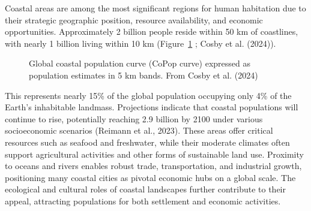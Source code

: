\documentclass[
  letterpaper,
  11pt,
  english,
  singlespacing,
  headsepline]{MastersDoctoralThesis}
\begin{document}
\begin{spacing}{1.5}
Coastal areas are among the most significant regions for human
habitation due to their strategic geographic position, resource
availability, and economic opportunities. Approximately 2 billion people
reside within 50 km of coastlines, with nearly 1 billion living within
10 km (Figure~\ref{fig-CoastalPop} ; Cosby et al. (2024)).

\begin{figure}


\caption{\label{fig-CoastalPop}Global coastal population curve (CoPop
curve) expressed as population estimates in 5 km bands. From Cosby et
al. (2024)}

\end{figure}%

This represents nearly 15\% of the global population occupying only 4\%
of the Earth's inhabitable landmass. Projections indicate that coastal
populations will continue to rise, potentially reaching 2.9 billion by
2100 under various socioeconomic scenarios (Reimann et al., 2023). These
areas offer critical resources such as seafood and freshwater, while
their moderate climates often support agricultural activities and other
forms of sustainable land use. Proximity to oceans and rivers enables
robust trade, transportation, and industrial growth, positioning many
coastal cities as pivotal economic hubs on a global scale. The
ecological and cultural roles of coastal landscapes further contribute
to their appeal, attracting populations for both settlement and economic
activities.


\end{spacing}
\end{document}
